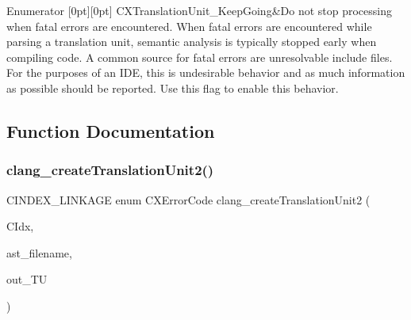 \begin{DoxyEnumFields}{Enumerator}
[0pt][0pt]{}\mbox{\label{group__CINDEX__TRANSLATION__UNIT_ggab1e4965c1ebe8e41d71e90203a723fe9afda3272e16e2aa499fc265615991f968}} 
C\+X\+Translation\+Unit\+\_\+\+Keep\+Going&Do not stop processing when fatal errors are encountered. When fatal errors are encountered while parsing a translation unit, semantic analysis is typically stopped early when compiling code. A common source for fatal errors are unresolvable include files. For the purposes of an I\+DE, this is undesirable behavior and as much information as possible should be reported. Use this flag to enable this behavior. \\
\hline

\end{DoxyEnumFields}


\subsection{Function Documentation}
\mbox{\label{group__CINDEX__TRANSLATION__UNIT_ga749a8220b23a06ba2fdcbea06d6bb211}} 
\subsubsection{\texorpdfstring{clang\+\_\+create\+Translation\+Unit2()}{clang\_createTranslationUnit2()}}
{\footnotesize\ttfamily C\+I\+N\+D\+E\+X\+\_\+\+L\+I\+N\+K\+A\+GE enum C\+X\+Error\+Code clang\+\_\+create\+Translation\+Unit2 (\begin{DoxyParamCaption}\item[{\mbox{\hyperlink{group__CINDEX_gae039c2574bfd75774ca7a9a3e55910cb}{C\+X\+Index}}}]{C\+Idx,  }\item[{const char $\ast$}]{ast\+\_\+filename,  }\item[{\mbox{\hyperlink{group__CINDEX_gacdb7815736ca709ce9a5e1ec2b7e16ac}{C\+X\+Translation\+Unit}} $\ast$}]{out\+\_\+\+TU }\end{DoxyParamCaption})}



